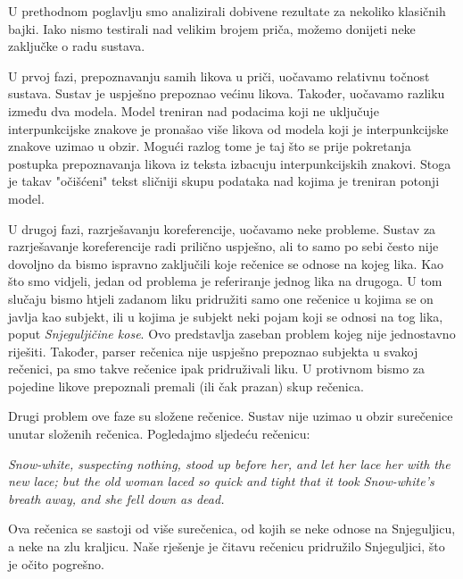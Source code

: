 \documentclass[a4paper,twoside,12pt]{memoir} %
\newcommand{\ti}[1]{\textit{#1\/}}
\begin{document}
		U prethodnom poglavlju smo analizirali dobivene rezultate za nekoliko klasičnih bajki. Iako nismo testirali nad velikim brojem priča, možemo donijeti neke zaključke o radu sustava.

		\bigskip

		U prvoj fazi, prepoznavanju samih likova u priči, uočavamo relativnu točnost sustava. Sustav je uspješno prepoznao većinu likova. Također, uočavamo razliku između dva modela. Model treniran nad podacima koji ne uključuje interpunkcijske znakove je pronašao više likova od modela koji je interpunkcijske znakove uzimao u obzir. Mogući razlog tome je taj što se prije pokretanja postupka prepoznavanja likova iz teksta izbacuju interpunkcijskih znakovi. Stoga je takav "očišćeni" tekst sličniji skupu podataka nad kojima je treniran potonji model.

		\bigskip

		U drugoj fazi, razrješavanju koreferencije, uočavamo neke probleme. Sustav za razrješavanje koreferencije radi prilično uspješno, ali to samo po sebi često nije dovoljno da bismo ispravno zaključili koje rečenice se odnose na kojeg lika. Kao što smo vidjeli, jedan od problema je referiranje jednog lika na drugoga. U tom slučaju bismo htjeli zadanom liku pridružiti samo one rečenice u kojima se on javlja kao subjekt, ili u kojima je subjekt neki pojam koji se odnosi na tog lika, poput \ti{Snjeguljičine kose}. Ovo predstavlja zaseban problem kojeg nije jednostavno riješiti. Također, parser rečenica nije uspješno prepoznao subjekta u svakoj rečenici, pa smo takve rečenice ipak pridruživali liku. U protivnom bismo za pojedine likove prepoznali premali (ili čak prazan) skup rečenica.

		Drugi problem ove faze su složene rečenice. Sustav nije uzimao u obzir su\-re\-če\-ni\-ce unutar složenih rečenica. Pogledajmo sljedeću rečenicu:

		\begin{displayquote}
			\ti{Snow-white, suspecting nothing, stood up before her, and
			let her lace her with the new lace; but the old woman laced so
			quick and tight that it took Snow-white's breath away, and she fell
			down as dead.}
		\end{displayquote}

		Ova rečenica se sastoji od više surečenica, od kojih se neke odnose na Snjeguljicu, a neke na zlu kraljicu. Naše rješenje je čitavu rečenicu pridružilo Snjeguljici, što je očito pogrešno.
\end{document}
